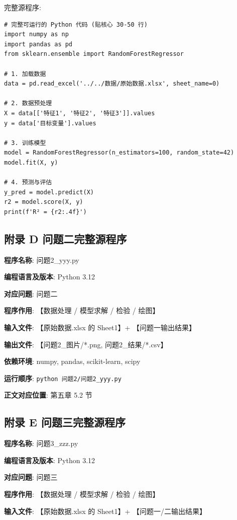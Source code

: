 完整源程序:
\begin{verbatim}
# 完整可运行的 Python 代码 (贴核心 30-50 行)
import numpy as np
import pandas as pd
from sklearn.ensemble import RandomForestRegressor

# 1. 加载数据
data = pd.read_excel('../../数据/原始数据.xlsx', sheet_name=0)

# 2. 数据预处理
X = data[['特征1', '特征2', '特征3']].values
y = data['目标变量'].values

# 3. 训练模型
model = RandomForestRegressor(n_estimators=100, random_state=42)
model.fit(X, y)

# 4. 预测与评估
y_pred = model.predict(X)
r2 = model.score(X, y)
print(f'R² = {r2:.4f}')
\end{verbatim}

\subsection*{附录 D \quad 问题二完整源程序}

\textbf{程序名称}: 问题2\_yyy.py

\textbf{编程语言及版本}: Python 3.12

\textbf{对应问题}: 问题二

\textbf{程序作用}: 【数据处理 / 模型求解 / 检验 / 绘图】

\textbf{输入文件}: 【原始数据.xlsx 的 Sheet1】+ 【问题一输出结果】

\textbf{输出文件}: 【问题2\_图片/*.png, 问题2\_结果/*.csv】

\textbf{依赖环境}: numpy, pandas, scikit-learn, scipy

\textbf{运行顺序}: \texttt{python 问题2/问题2\_yyy.py}

\textbf{正文对应位置}: 第五章 5.2 节


\subsection*{附录 E \quad 问题三完整源程序}

\textbf{程序名称}: 问题3\_zzz.py

\textbf{编程语言及版本}: Python 3.12

\textbf{对应问题}: 问题三

\textbf{程序作用}: 【数据处理 / 模型求解 / 检验 / 绘图】

\textbf{输入文件}: 【原始数据.xlsx 的 Sheet1】+ 【问题一/二输出结果】

